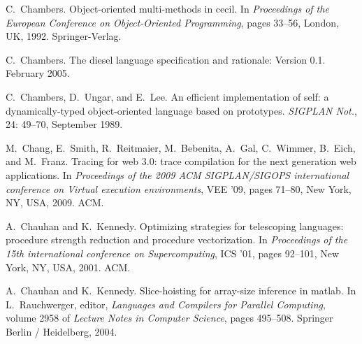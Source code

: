\documentclass[9pt]{sigplanconf}
\begin{document}
\begin{thebibliography}{42}
C.~Chambers.
\newblock Object-oriented multi-methods in cecil.
\newblock In \emph{Proceedings of the European Conference on Object-Oriented
  Programming}, pages 33--56, London, UK, 1992. Springer-Verlag.

C.~Chambers.
\newblock The diesel language specification and rationale: Version 0.1.
\newblock February 2005.

C.~Chambers, D.~Ungar, and E.~Lee.
\newblock An efficient implementation of self: a dynamically-typed
  object-oriented language based on prototypes.
\newblock \emph{SIGPLAN Not.}, 24: 49--70, September 1989.

M.~Chang, E.~Smith, R.~Reitmaier, M.~Bebenita, A.~Gal, C.~Wimmer, B.~Eich, and
  M.~Franz.
\newblock Tracing for web 3.0: trace compilation for the next generation web
  applications.
\newblock In \emph{Proceedings of the 2009 ACM SIGPLAN/SIGOPS international
  conference on Virtual execution environments}, VEE '09, pages 71--80, New
  York, NY, USA, 2009. ACM.

A.~Chauhan and K.~Kennedy.
\newblock Optimizing strategies for telescoping languages: procedure strength
  reduction and procedure vectorization.
\newblock In \emph{Proceedings of the 15th international conference on
  Supercomputing}, ICS '01, pages 92--101, New York, NY, USA, 2001. ACM.

A.~Chauhan and K.~Kennedy.
\newblock Slice-hoisting for array-size inference in matlab.
\newblock In L.~Rauchwerger, editor, \emph{Languages and Compilers for Parallel
  Computing}, volume 2958 of \emph{Lecture Notes in Computer Science}, pages
  495--508. Springer Berlin / Heidelberg, 2004.


\end{thebibliography}
\end{document}
